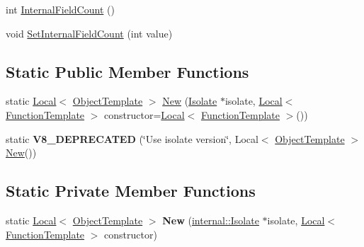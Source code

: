 \begin{DoxyCompactItemize}
\item 
int \hyperlink{classv8_1_1_object_template_a43de785d594d8c01b18230b1aa79e31c}{Internal\+Field\+Count} ()
\item 
void \hyperlink{classv8_1_1_object_template_ab63916ac584a76bca8ba541f86ce9fce}{Set\+Internal\+Field\+Count} (int value)
\end{DoxyCompactItemize}
\subsection*{Static Public Member Functions}
\begin{DoxyCompactItemize}
\item 
static \hyperlink{classv8_1_1_local}{Local}$<$ \hyperlink{classv8_1_1_object_template}{Object\+Template} $>$ \hyperlink{classv8_1_1_object_template_a092e8adf656359d4dead412d28313ebb}{New} (\hyperlink{classv8_1_1_isolate}{Isolate} $\ast$isolate, \hyperlink{classv8_1_1_local}{Local}$<$ \hyperlink{classv8_1_1_function_template}{Function\+Template} $>$ constructor=\hyperlink{classv8_1_1_local}{Local}$<$ \hyperlink{classv8_1_1_function_template}{Function\+Template} $>$())
\item 
static {\bfseries V8\+\_\+\+D\+E\+P\+R\+E\+C\+A\+T\+ED} (\char`\"{}Use isolate version\char`\"{}, Local$<$ \hyperlink{classv8_1_1_object_template}{Object\+Template} $>$ \hyperlink{classv8_1_1_object_template_a092e8adf656359d4dead412d28313ebb}{New}())\hypertarget{classv8_1_1_object_template_aca569a9eafe2f49f8638e0157d1b20a2}{}\label{classv8_1_1_object_template_aca569a9eafe2f49f8638e0157d1b20a2}

\end{DoxyCompactItemize}
\subsection*{Static Private Member Functions}
\begin{DoxyCompactItemize}
\item 
static \hyperlink{classv8_1_1_local}{Local}$<$ \hyperlink{classv8_1_1_object_template}{Object\+Template} $>$ {\bfseries New} (\hyperlink{classv8_1_1internal_1_1_isolate}{internal\+::\+Isolate} $\ast$isolate, \hyperlink{classv8_1_1_local}{Local}$<$ \hyperlink{classv8_1_1_function_template}{Function\+Template} $>$ constructor)\hypertarget{classv8_1_1_object_template_a16d886ee105d6ede4b560831f0160d31}{}\label{classv8_1_1_object_template_a16d886ee105d6ede4b560831f0160d31}

\end{DoxyCompactItemize}
